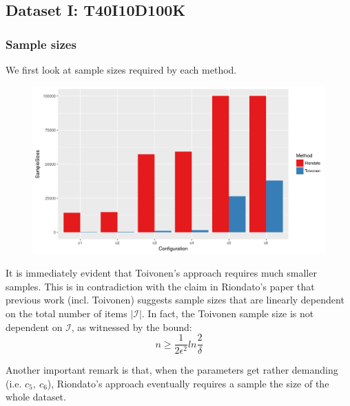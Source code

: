 \documentclass[11pt]{sigplanconf}
\newcommand\I{\mathcal{I}}
\begin{document}
\subsection{Dataset I: T40I10D100K}
\subsubsection{Sample sizes}
We first look at sample sizes required by each method.
\begin{figure}[h!]
\centering
\includegraphics[width=\columnwidth]{T40I10D100K.dat/sampleSizes.png}
\end{figure}

It is immediately evident that Toivonen's approach requires much smaller samples. This is in contradiction with the claim in Riondato's paper that previous work (incl. Toivonen) suggests sample sizes that are linearly dependent on the total number of items $|\I|$. In fact, the Toivonen sample size is not dependent on $\I$, as witnessed by the bound:
\[ n \geq \frac{1}{2\epsilon^2}ln\frac{2}{\delta} 
\]

Another important remark is that, when the parameters get rather demanding (i.e. $c_5,\ c_6$), Riondato's approach eventually requires a sample the size of the whole dataset.
\end{document}
